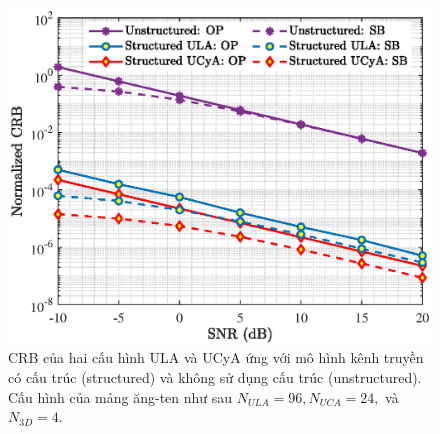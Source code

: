 \begin{figure}[ht]
    \centering
    \includegraphics[width=\linewidth]{figures/fig_1_3.eps}
    \caption{CRB của hai cấu hình ULA và UCyA ứng với mô hình kênh truyền có cấu trúc (structured) và không sử dụng cấu trúc (unstructured). Cấu hình của mảng ăng-ten như sau $N_{ULA} = 96, N_{UCA} = 24,$ và $N_{3D} = 4$.}
    \label{fig:op}
\end{figure}

